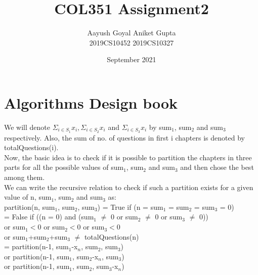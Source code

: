 \documentclass{article}
\title{COL351 Assignment2}
\author{Aayush Goyal \hspace{2cm} Aniket Gupta
\\ 2019CS10452    \hspace{2.3cm}    2019CS10327}
\date{September 2021}
\begin{document}
\maketitle

\section{Algorithms Design book}
We will denote $\Sigma_{i\in{S_{1}}}x_{i}, \Sigma_{i\in{S_{2}}}x_{i}$ and $\Sigma_{i\in{S_{3}}}x_{i}$ by sum$_{1}$, sum$_{2}$ and sum$_{3}$ respectively. Also, the sum of no. of questions in first i chapters is denoted by totalQuestions(i).
\\
Now, the basic idea is to check if it is possible to partition the chapters in three parts for all the possible values of sum$_{1}$, sum$_{2}$ and sum$_{3}$ and then chose the best among them.
\\
We can write the recursive relation to check if such a partition exists for a given value of n, sum$_{1}$, sum$_{2}$ and sum$_{3}$ as:
\\
partition(n, sum$_{1}$, sum$_{2}$, sum$_{3}$) = True \hspace{1.5cm} if (n = sum$_{1}$ = sum$_{2}$ = sum$_{3}$ = 0)
\\\indent  \hspace{4.3cm}     = False \hspace{1.5cm} if ((n = 0) and (sum$_{1}$ $\neq$ 0 or sum$_{2}$ $\neq$ 0 or sum$_{3}$ $\neq$ 0))
\\\indent  \hspace{7.2cm} or sum$_{1}<0$ or sum$_{2}<0$ or sum$_{3}<0$ 
\\\indent  \hspace{7.2cm} or sum$_{1}$+sum$_{2}$+sum$_{3}$ $\neq$ totalQuestions(n)
\\\indent  \hspace{4.3cm}     = partition(n-1, sum$_{1}$-x$_{n}$, sum$_{2}$, sum$_{3}$) 
\\\indent  \hspace{4.8cm}or partition(n-1, sum$_{1}$, sum$_{2}$-x$_{n}$, sum$_{3}$) 
\\\indent  \hspace{4.8cm}or partition(n-1, sum$_{1}$, sum$_{2}$, sum$_{3}$-x$_{n}$)
\end{document}
